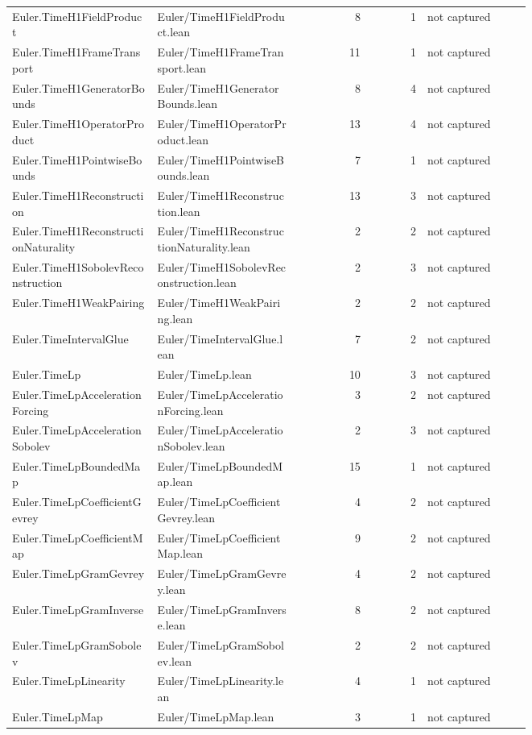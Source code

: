 \documentclass[10pt]{article}
\begin{document}
\begin{longtable}{p{0.28\linewidth}p{0.27\linewidth}r r p{0.20\linewidth}}
Euler.TimeH1FieldProduct & Euler/TimeH1FieldProduct.lean & 8 & 1 & not captured\\
Euler.TimeH1FrameTransport & Euler/TimeH1FrameTransport.lean & 11 & 1 & not captured\\
Euler.TimeH1GeneratorBounds & Euler/TimeH1GeneratorBounds.lean & 8 & 4 & not captured\\
Euler.TimeH1OperatorProduct & Euler/TimeH1OperatorProduct.lean & 13 & 4 & not captured\\
Euler.TimeH1PointwiseBounds & Euler/TimeH1PointwiseBounds.lean & 7 & 1 & not captured\\
Euler.TimeH1Reconstruction & Euler/TimeH1Reconstruction.lean & 13 & 3 & not captured\\
Euler.TimeH1ReconstructionNaturality & Euler/TimeH1ReconstructionNaturality.lean & 2 & 2 & not captured\\
Euler.TimeH1SobolevReconstruction & Euler/TimeH1SobolevReconstruction.lean & 2 & 3 & not captured\\
Euler.TimeH1WeakPairing & Euler/TimeH1WeakPairing.lean & 2 & 2 & not captured\\
Euler.TimeIntervalGlue & Euler/TimeIntervalGlue.lean & 7 & 2 & not captured\\
Euler.TimeLp & Euler/TimeLp.lean & 10 & 3 & not captured\\
Euler.TimeLpAccelerationForcing & Euler/TimeLpAccelerationForcing.lean & 3 & 2 & not captured\\
Euler.TimeLpAccelerationSobolev & Euler/TimeLpAccelerationSobolev.lean & 2 & 3 & not captured\\
Euler.TimeLpBoundedMap & Euler/TimeLpBoundedMap.lean & 15 & 1 & not captured\\
Euler.TimeLpCoefficientGevrey & Euler/TimeLpCoefficientGevrey.lean & 4 & 2 & not captured\\
Euler.TimeLpCoefficientMap & Euler/TimeLpCoefficientMap.lean & 9 & 2 & not captured\\
Euler.TimeLpGramGevrey & Euler/TimeLpGramGevrey.lean & 4 & 2 & not captured\\
Euler.TimeLpGramInverse & Euler/TimeLpGramInverse.lean & 8 & 2 & not captured\\
Euler.TimeLpGramSobolev & Euler/TimeLpGramSobolev.lean & 2 & 2 & not captured\\
Euler.TimeLpLinearity & Euler/TimeLpLinearity.lean & 4 & 1 & not captured\\
Euler.TimeLpMap & Euler/TimeLpMap.lean & 3 & 1 & not captured\\

\end{longtable}
\end{document}
